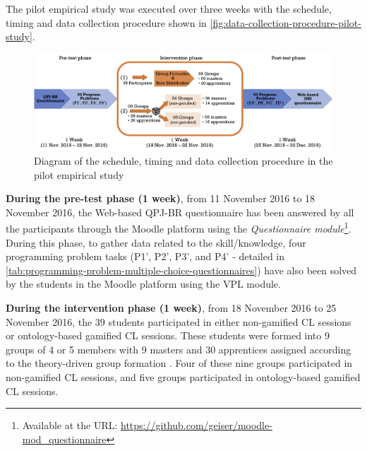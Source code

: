 The pilot empirical study was executed over three weeks with the schedule, timing and data collection procedure shown in \autoref{fig:data-collection-procedure-pilot-study}.

\begin{figure}[htb]
 \caption{Diagram of the schedule, timing and data collection procedure in the pilot empirical study}
 \label{fig:data-collection-procedure-pilot-study}
 \centering
 \includegraphics[width=1\textwidth]{images/chap-evaluation/data-collection-procedure-pilot-study.png}
 \fautor
\end{figure}

\textbf{During the pre-test phase (1 week)}, from 11 November 2016 to 18 November 2016, the Web-based QPJ-BR questionnaire has been answered by all the participants through the Moodle platform using the \emph{Questionnaire module}\footnote{Available at the URL: \url{https://github.com/geiser/moodle-mod\_questionnaire}}. During this phase, to gather data related to the skill/knowledge, four programming problem tasks (P1', P2', P3', and P4' - detailed in \autoref{tab:programming-problem-multiple-choice-questionnaires}) have also been solved by the students in the Moodle platform using the VPL module.

\textbf{During the intervention phase (1 week)}, from 18 November 2016 to 25 November 2016, the 39 students participated in either non-gamified CL sessions or ontology-based gamified CL sessions. These students were formed into 9 groups of 4 or 5 members with 9 masters and 30 apprentices assigned according to the theory-driven group formation \cite{IsotaniMizoguchi2008a}. Four of these nine groups participated in non-gamified CL sessions, and five groups participated in ontology-based gamified CL sessions.

